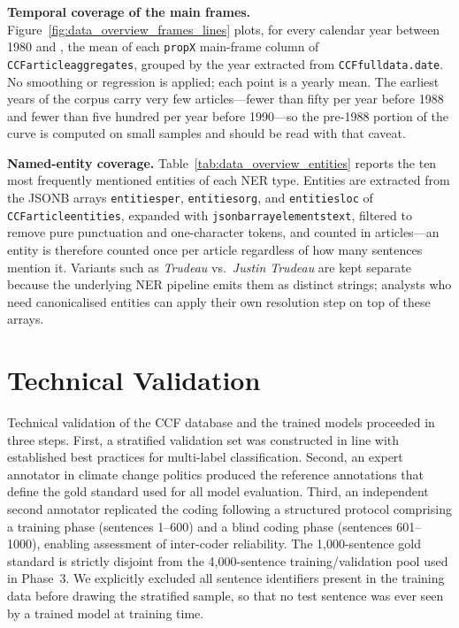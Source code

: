 \documentclass[12pt]{article}
\renewcommand\_{\texttt{\detokenize{_}\allowbreak}}
\begin{document}
{\bfseries{Temporal coverage of the main frames.}} Figure~\ref{fig:data_overview_frames_lines} plots, for every calendar year between 1980 and \CCFyearlast{}, the mean of each \texttt{prop\_X} main-frame column of \texttt{CCF\_article\_aggregates}, grouped by the year extracted from \texttt{CCF\_full\_data.date}. No smoothing or regression is applied; each point is a yearly mean. The earliest years of the corpus carry very few articles---fewer than fifty per year before 1988 and fewer than five hundred per year before 1990---so the pre-1988 portion of the curve is computed on small samples and should be read with that caveat.

{\bfseries{Named-entity coverage.}} Table~\ref{tab:data_overview_entities} reports the ten most frequently mentioned entities of each NER type. Entities are extracted from the JSONB arrays \texttt{entities\_per}, \texttt{entities\_org}, and \texttt{entities\_loc} of \texttt{CCF\_article\_entities}, expanded with \texttt{jsonb\_array\_elements\_text}, filtered to remove pure punctuation and one-character tokens, and counted in articles---an entity is therefore counted once per article regardless of how many sentences mention it. Variants such as \emph{Trudeau} vs.\ \emph{Justin Trudeau} are kept separate because the underlying NER pipeline emits them as distinct strings; analysts who need canonicalised entities can apply their own resolution step on top of these arrays.

\clearpage
\section{Technical Validation}
\label{sec:technical_validation}

Technical validation of the CCF database and the trained models proceeded in three steps. First, a stratified validation set was constructed in line with established best practices for multi-label classification. Second, an expert annotator in climate change politics produced the reference annotations that define the gold standard used for all model evaluation. Third, an independent second annotator replicated the coding following a structured protocol comprising a training phase (sentences 1–600) and a blind coding phase (sentences 601–1000), enabling assessment of inter-coder reliability. The 1{,}000-sentence gold standard is strictly disjoint from the 4{,}000-sentence training/validation pool used in Phase~3. We explicitly excluded all sentence identifiers present in the training data before drawing the stratified sample, so that no test sentence was ever seen by a trained model at training time.
\end{document}

